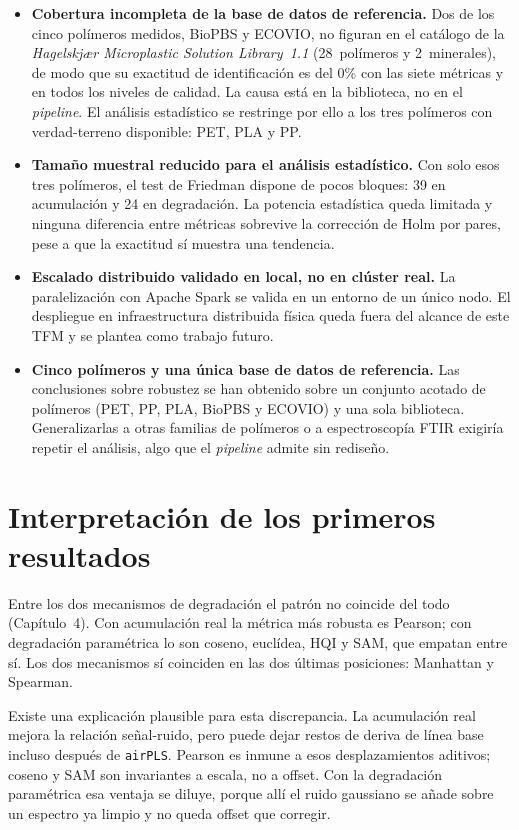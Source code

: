 \begin{itemize}
    \item \textbf{Cobertura incompleta de la base de datos de referencia.} Dos de los cinco polímeros medidos, BioPBS y ECOVIO, no figuran en el catálogo de la \emph{Hagelskjær Microplastic Solution Library~1.1} (28~polímeros y 2~minerales), de modo que su exactitud de identificación es del 0\% con las siete métricas y en todos los niveles de calidad. La causa está en la biblioteca, no en el \textit{pipeline}. El análisis estadístico se restringe por ello a los tres polímeros con verdad-terreno disponible: PET, PLA y PP.
    \item \textbf{Tamaño muestral reducido para el análisis estadístico.} Con solo esos tres polímeros, el test de Friedman dispone de pocos bloques: 39 en acumulación y 24 en degradación. La potencia estadística queda limitada y ninguna diferencia entre métricas sobrevive la corrección de Holm por pares, pese a que la exactitud sí muestra una tendencia.
    \item \textbf{Escalado distribuido validado en local, no en clúster real.} La paralelización con Apache Spark se valida en un entorno de un único nodo. El despliegue en infraestructura distribuida física queda fuera del alcance de este TFM y se plantea como trabajo futuro.
    \item \textbf{Cinco polímeros y una única base de datos de referencia.} Las conclusiones sobre robustez se han obtenido sobre un conjunto acotado de polímeros (PET, PP, PLA, BioPBS y ECOVIO) y una sola biblioteca. Generalizarlas a otras familias de polímeros o a espectroscopía FTIR exigiría repetir el análisis, algo que el \textit{pipeline} admite sin rediseño.
\end{itemize}

\section{Interpretación de los primeros resultados}

Entre los dos mecanismos de degradación el patrón no coincide del todo (Capítulo~4). Con acumulación real la métrica más robusta es Pearson; con degradación paramétrica lo son coseno, euclídea, HQI y SAM, que empatan entre sí. Los dos mecanismos sí coinciden en las dos últimas posiciones: Manhattan y Spearman.

Existe una explicación plausible para esta discrepancia. La acumulación real mejora la relación señal-ruido, pero puede dejar restos de deriva de línea base incluso después de \texttt{airPLS}. Pearson es inmune a esos desplazamientos aditivos; coseno y SAM son invariantes a escala, no a offset. Con la degradación paramétrica esa ventaja se diluye, porque allí el ruido gaussiano se añade sobre un espectro ya limpio y no queda offset que corregir.

